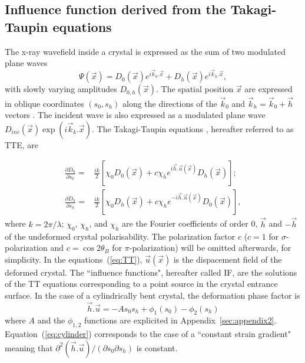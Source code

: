 \documentclass[preprint]{iucr}              %
\newcommand{\inblue}[1]{{\color{black}#1}}
\begin{document}
\subsection{Influence function derived from the Takagi-Taupin equations}
\label{sec:influence}

The x-ray wavefield \inblue{inside a crystal} is expressed as the sum of two modulated plane waves
\begin{equation}
    \Psi(\vec x) = D_0(\vec x) e^{i \vec k_0 . \vec x} + D_h(\vec x) e^{i \vec k_h . \vec x},
\end{equation}
with slowly varying amplitudes $D_{0,h}(\vec x)$.
\inblue{The spatial position $\vec x$ are expressed in oblique coordinates $(s_0,s_h)$ along the directions of the $\vec k_0$ and $\vec k_h=\vec k_0 + \vec h$ vectors .}
The incident wave is also expressed as a modulated plane wave $D_{inc}(\vec x) \exp(i\vec k_k . \vec x)$. The Takagi-Taupin equations  \cite{Takagi1962, Takagi, Taupin, Taupin1967}, hereafter referred to as TTE, are

\begin{equation}
\label{eq:TT}
\begin{aligned}
\frac{\partial D_0}{\partial s_0} =& \frac{ik}{2} \left[ \chi_0 D_0(\vec x)+c \chi_{\bar h} e^{i \vec h . \vec u (\vec x)} D_h(\vec x) \right]; \\
\frac{\partial D_h}{\partial s_h} =& \frac{ik}{2} \left[ \chi_0 D_h(\vec x)+c \chi_{h} e^{-i \vec h . \vec u (\vec x)} D_0(\vec x) \right],
\end{aligned}
\end{equation}
where $k=2\pi/\lambda$; $\chi_0$, $\chi_h$, and $\chi_{\bar h}$ are the Fourier coefficients of order 0, $\vec h$ and $-\vec h$ of the undeformed crystal polarisability. The \inblue{polarization} factor $c$ ($c=1$ for $\sigma$-polarization and $c=\cos2\theta_B$  for $\pi$-polarization) will be omitted afterwards, for simplicity. 
In the equations~(\ref{eq:TT}), $\vec u (\vec x)$ is the dispacement field of the deformed crystal. The ``influence functions", hereafter called IF, are the solutions of the TT equations corresponding to a point source in the crystal entrance surface.
In the case of a cylindrically bent crystal, the deformation phase factor is
\begin{equation}
\label{eq:cylinder}
    \vec h . \vec u = -A s_0 s_h + \phi_1(s_0) - \phi_2(s_h)
\end{equation}
where $A$ and the $\phi_{1,2}$ functions are explicited in Appendix~\ref{sec:appendix2}.
Equation~(\ref{eq:cylinder}) corresponds to the case of a ``constant strain gradient" \cite{authierbook} meaning that $\partial^2(\vec h . \vec u)/(\partial s_0 \partial s_h)$ is constant.
\end{document}
